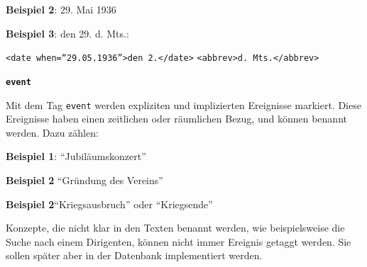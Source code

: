 \documentclass[12pt, a4paper, ngerman, bidi=default]{article}
\begin{document}
\begin{description}
    \textbf{ Beispiel 2}: 29. Mai 1936

    \textbf{ Beispiel 3}: den 29. d. Mts.:

    \colorbox{VeryLightGray}{\texttt{\textless date when=\enquote{29.05.1936}\textgreater den 2.\textless /date\textgreater} \texttt{\textless abbrev\textgreater d. Mts.\textless /abbrev\textgreater}}

    \item \textbf{\colorbox{eventTag}{\texttt{event}}}
    
    Mit dem Tag \texttt{\colorbox{eventTag}{event}} werden expliziten und implizierten Ereignisse markiert. Diese Ereignisse haben einen zeitlichen oder räumlichen Bezug, und können benannt werden. Dazu zählen:

    \noindent \textbf{ Beispiel 1}: \enquote{Jubiläumskonzert}

    \textbf{ Beispiel 2} \enquote{Gründung des Vereins} 

    \textbf{ Beispiel 2}\enquote{Kriegsausbruch} oder \enquote{Kriegsende}

    Konzepte, die nicht klar in den Texten benannt werden, wie beispielsweise die Suche nach einem Dirigenten, können nicht immer Ereignis getaggt werden. Sie sollen später aber in der Datenbank implementiert werden.
    \end{description}
    
\end{document}
